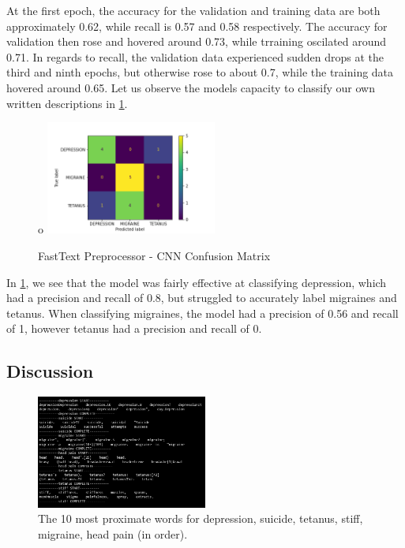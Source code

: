 \documentclass[12pt]{report}
\begin{document}
At the first epoch, the accuracy for the validation and training data are both
approximately 0.62, while recall is 0.57 and 0.58 respectively. The accuracy
for validation then rose and hovered around 0.73, while trraining oscilated
around 0.71. In regards to recall, the validation data experienced sudden drops
at the third and ninth epochs, but otherwise rose to about 0.7, while the
training data hovered around 0.65. Let us observe the models capacity to classify
our own written descriptions in \ref{fig:ft-con}.

\begin{figure}[h!]o
	\centering
	\includegraphics[width=0.5\textwidth]{confusion_matrix_ft.png}
	\caption{FastText Preprocessor - CNN Confusion Matrix}
	\label{fig:ft-con}
\end{figure}

In \ref{fig:ft-con}, we see that the model was fairly effective at classifying
depression, which had a precision and recall of 0.8, but struggled to accurately
label migraines and tetanus. When classifying migraines, the model had a
precision of 0.56 and recall of 1, however tetanus had a precision and recall of
0.

\subsection{Discussion}

\begin{figure}[h!]
	\centering
	\includegraphics[width=0.5\textwidth]{proximate-words.png}
	\caption{The 10 most proximate words for depression, suicide, tetanus, stiff, migraine, head pain (in order).}
	\label{fig:prox-words}
\end{figure}
\end{document}
